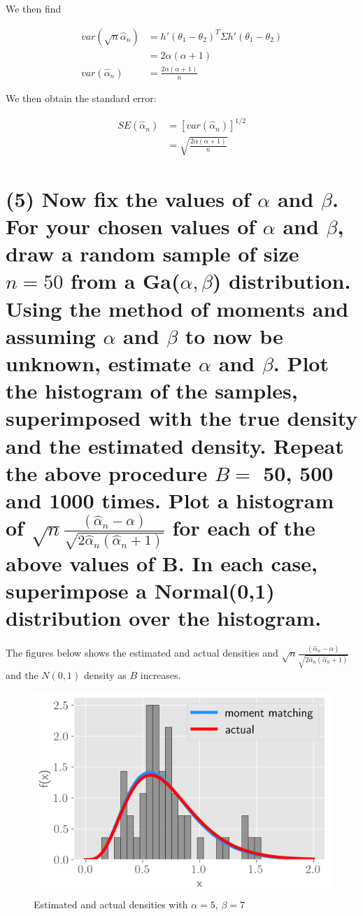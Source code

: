 \documentclass[11pt]{article}
\begin{document}
We then find

\begin{align*}
    var(\sqrt{n}\hat{\alpha}_n) &= h'(\theta_1 - \theta_2)^T\Sigma h'(\theta_1 - \theta_2)\\
    &= 2\alpha(\alpha+1)\\
     var(\hat{\alpha}_n) &= \frac{2\alpha(\alpha+1)}{n}
\end{align*}

We then obtain the standard error:


\begin{align*}
    SE(\hat{\alpha}_n) &=  [var(\hat{\alpha}_n)]^{1/2}\\
    &= \sqrt{\frac{2\alpha(\alpha+1)}{n}}
\end{align*}




 
\section*{(5) Now fix the values of $\alpha$ and $\beta$. For your chosen values of $\alpha$ and $\beta$, draw a random sample of size $n=50$ from a Ga($\alpha, \beta$) distribution. Using the method of moments and assuming $\alpha$ and $\beta$ to now be unknown, estimate $\alpha$ and $\beta$. Plot the histogram of the samples, superimposed with the true density and the estimated density. Repeat the above procedure $B = $ 50, 500 and 1000 times. Plot a histogram of $\sqrt{n}\frac{(\hat{\alpha}_n - \alpha)}{\sqrt{2\hat{\alpha}_n(\hat{\alpha}_n+1)}}$ for each of the above values of B. In each case, superimpose a Normal(0,1) distribution over the histogram.}
 
The figures below shows the estimated and actual densities and $\sqrt{n}\frac{(\hat{\alpha}_n - \alpha)}{\sqrt{2\hat{\alpha}_n(\hat{\alpha}_n+1)}}$ and the $N(0, 1)$ density as $B$ increases.


\begin{figure}[!h]
    \centering
    \includegraphics[scale=.7]{homework_1/first_hist.png}
    \caption{Estimated and actual densities with $\alpha = 5$, $\beta = 7$}
    \label{fig:my_label}
\end{figure}
\end{document}
